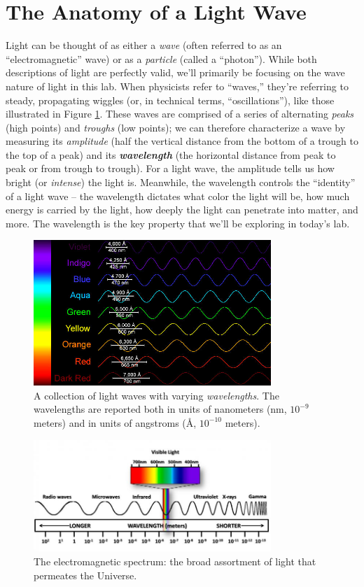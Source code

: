 \documentclass[11pt]{article}
\begin{document}
\section{The Anatomy of a Light Wave}
Light can be thought of as either a \emph{wave} (often referred to as an ``electromagnetic'' wave) or as a \emph{particle} (called a ``photon''). While both descriptions of light are perfectly valid, we'll primarily be focusing on the wave nature of light in this lab. When physicists refer to ``waves,'' they're referring to steady, propagating wiggles (or, in technical terms, ``oscillations''), like those illustrated in Figure \ref{fig:lightwaves}. These waves are comprised of a series of alternating \emph{peaks} (high points) and \emph{troughs} (low points); we can therefore characterize a wave by measuring its \emph{amplitude} (half the vertical distance from the bottom of a trough to the top of a peak) and its \textbf{\emph{wavelength}} (the horizontal distance from peak to peak or from trough to trough). For a light wave, the amplitude tells us how bright (or \emph{intense}) the light is. Meanwhile, the wavelength controls the ``identity'' of a light wave -- the wavelength dictates what color the light will be, how much energy is carried by the light, how deeply the light can penetrate into matter, and more. The wavelength is the key property that we'll be exploring in today's lab.

\begin{figure}[h!]
    \centering
    \includegraphics[width=0.8\textwidth]{light waves.jpg}
    \caption{A collection of light waves with varying \emph{wavelengths}. The wavelengths are reported both in units of nanometers (nm, $10^{-9}$ meters) and in units of angstroms (\AA, $10^{-10}$ meters).}
    \label{fig:lightwaves}
\end{figure}

\begin{figure}
    \centering
    \includegraphics[width=0.8\textwidth]{EM spectrum.jpg}
    \caption{The electromagnetic spectrum: the broad assortment of light that permeates the Universe.}
    \label{fig:spectrum}
\end{figure}
\end{document}
